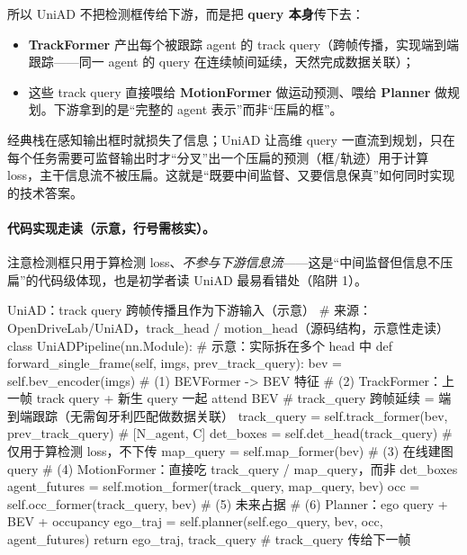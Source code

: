 所以 UniAD 不把检测框传给下游，而是把 \textbf{query 本身}传下去：
\begin{itemize}
  \item \textbf{TrackFormer} 产出每个被跟踪 agent 的 track query（跨帧传播，实现端到端跟踪——同一 agent 的 query 在连续帧间延续，天然完成数据关联）；
  \item 这些 track query 直接喂给 \textbf{MotionFormer} 做运动预测、喂给 \textbf{Planner} 做规划。下游拿到的是“完整的 agent 表示”而非“压扁的框”。
\end{itemize}

\begin{insight}
经典栈在感知输出框时就损失了信息；UniAD 让高维 query 一直流到规划，只在每个任务需要可监督输出时才“分叉”出一个压扁的预测（框/轨迹）用于计算 loss，主干信息流不被压扁。这就是“既要中间监督、又要信息保真”如何同时实现的技术答案。
\end{insight}

\paragraph{代码实现走读（示意，行号需核实）。}
注意检测框只用于算检测 loss、\emph{不参与下游信息流}——这是“中间监督但信息不压扁”的代码级体现，也是初学者读 UniAD 最易看错处（陷阱 1）。

\begin{codebox}[Python]{UniAD：track query 跨帧传播且作为下游输入（示意）}
# 来源：OpenDriveLab/UniAD，track_head / motion_head（源码结构，示意性走读）
class UniADPipeline(nn.Module):                 # 示意：实际拆在多个 head 中
    def forward_single_frame(self, imgs, prev_track_query):
        bev = self.bev_encoder(imgs)            # (1) BEVFormer -> BEV 特征
        # (2) TrackFormer：上一帧 track query + 新生 query 一起 attend BEV
        #     track_query 跨帧延续 = 端到端跟踪（无需匈牙利匹配做数据关联）
        track_query = self.track_former(bev, prev_track_query)   # [N_agent, C]
        det_boxes  = self.det_head(track_query)  # 仅用于算检测 loss，不下传
        map_query  = self.map_former(bev)        # (3) 在线建图 query
        # (4) MotionFormer：直接吃 track_query / map_query，而非 det_boxes
        agent_futures = self.motion_former(track_query, map_query, bev)
        occ = self.occ_former(track_query, bev)  # (5) 未来占据
        # (6) Planner：ego query + BEV + occupancy
        ego_traj = self.planner(self.ego_query, bev, occ, agent_futures)
        return ego_traj, track_query             # track_query 传给下一帧
\end{codebox}

